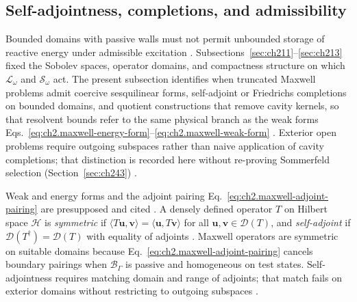 \subsection{Self-adjointness, completions, and admissibility}
\label{sec:ch214}

Bounded domains with passive walls must not permit unbounded storage of reactive energy under admissible excitation \cite{stratton1941}. Subsections~\ref{sec:ch211}--\ref{sec:ch213} fixed the Sobolev spaces, operator domains, and compactness structure on which \(\mathcal{L}_\omega\) and \(\mathcal{S}_\omega\) act. The present subsection identifies when truncated Maxwell problems admit coercive sesquilinear forms, self-adjoint or Friedrichs completions on bounded domains, and quotient constructions that remove cavity kernels, so that resolvent bounds refer to the same physical branch as the weak forms Eqs.~\eqref{eq:ch2.maxwell-energy-form}--\eqref{eq:ch2.maxwell-weak-form} \cite{harrington2001}. Exterior open problems require outgoing subspaces rather than naive application of cavity completions; that distinction is recorded here without re-proving Sommerfeld selection (Section~\ref{sec:ch243}) \cite{sommerfeld1949}.

Weak and energy forms and the adjoint pairing Eq.~\eqref{eq:ch2.maxwell-adjoint-pairing} are presupposed and cited \cite{stratton1941}. A densely defined operator \(T\) on Hilbert space \(\mathcal{H}\) is \emph{symmetric} if \(\langle T\mathbf{u},\mathbf{v}\rangle=\langle\mathbf{u},T\mathbf{v}\rangle\) for all \(\mathbf{u},\mathbf{v}\in\mathcal{D}(T)\), and \emph{self-adjoint} if \(\mathcal{D}(T^{\dagger})=\mathcal{D}(T)\) with equality of adjoints \cite{stratton1941}. Maxwell operators are symmetric on suitable domains because Eq.~\eqref{eq:ch2.maxwell-adjoint-pairing} cancels boundary pairings when \(\mathcal{B}_\Gamma\) is passive and homogeneous on test states. Self-adjointness requires matching domain and range of adjoints; that match fails on exterior domains without restricting to outgoing subspaces \cite{harrington2001}.

